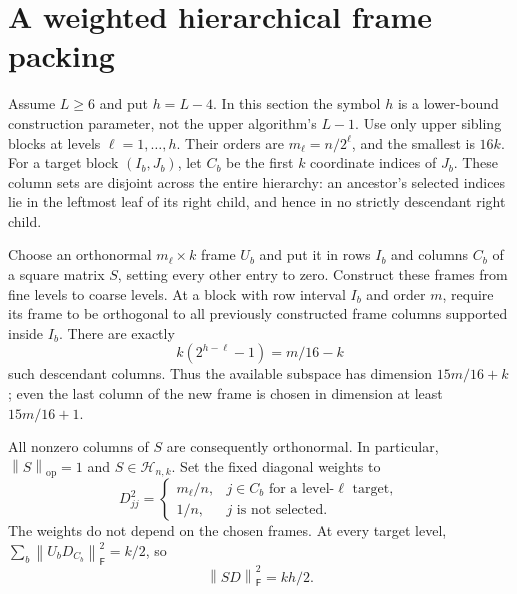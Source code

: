 \documentclass[11pt]{article}
\theoremstyle{remark}
\newcommand{\F}{\mathsf F}
\newcommand{\op}{\mathrm{op}}
\newcommand{\Hclass}{\mathcal H_{n,k}}
\newcommand{\norm}[1]{\left\lVert #1\right\rVert}
\begin{document}
\section{A weighted hierarchical frame packing}\label{sec:packing}

Assume $L\ge6$ and put $h=L-4$. In this section the symbol $h$ is a
lower-bound construction parameter, not the upper algorithm's $L-1$.
Use only upper sibling blocks at levels $\ell=1,\ldots,h$. Their orders are
$m_\ell=n/2^\ell$, and the smallest is $16k$.
For a target block $(I_b,J_b)$, let $C_b$ be the first $k$ coordinate indices
of $J_b$. These column sets are disjoint across the entire hierarchy:
an ancestor's selected indices lie in the leftmost leaf of its right child,
and hence in no strictly descendant right child.

Choose an orthonormal $m_\ell\times k$ frame $U_b$ and put it in rows $I_b$
and columns $C_b$ of a square matrix $S$, setting every other entry to zero.
Construct these frames from fine levels to coarse levels. At a block with
row interval $I_b$ and order $m$, require its frame to be orthogonal to all
previously constructed frame columns supported inside $I_b$.
There are exactly
\[
 k(2^{h-\ell}-1)=m/16-k
\]
such descendant columns. Thus the available subspace has dimension
$15m/16+k$; even the last column of the new frame is chosen in dimension at
least $15m/16+1$.

All nonzero columns of $S$ are consequently orthonormal. In particular,
$\norm S_\op=1$ and $S\in\Hclass$. Set the fixed diagonal weights to
\begin{equation}\label{eq:weights}
 D_{jj}^2=\begin{cases}
 m_\ell/n,&j\in C_b\text{ for a level-}\ell\text{ target},\\
 1/n,&j\text{ is not selected}.
 \end{cases}
\end{equation}
The weights do not depend on the chosen frames. At every target level,
$\sum_b\norm{U_b D_{C_b}}_\F^2=k/2$, so
\begin{equation}\label{eq:weightednorm}
 \norm{SD}_\F^2=kh/2.
\end{equation}
\end{document}
